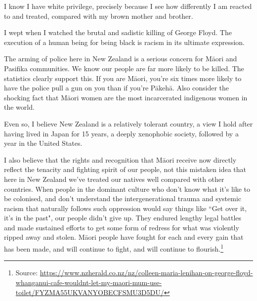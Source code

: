 \documentclass[10pt,a4paper]{article}
\newcommand{\qm}[1]{``#1"}
\newcommand{\source}[1]{\footnote{Source: \href{#1}{#1}}}
\begin{document}
I know I have white privilege, precisely because I see how differently I am reacted to and treated, compared with my brown mother and brother.

I wept when I watched the brutal and sadistic killing of George Floyd. The execution of a human being for being black is racism in its ultimate expression.

The arming of police here in New Zealand is a serious concern for Māori and Pasifika communities. We know our people are far more likely to be killed. The statistics clearly support this. If you are Māori, you're six times more likely to have the police pull a gun on you than if you're Pākehā. Also consider the shocking fact that Māori women are the most incarcerated indigenous women in the world.

Even so, I believe New Zealand is a relatively tolerant country, a view I hold after having lived in Japan for 15 years, a deeply xenophobic society, followed by a year in the United States.

I also believe that the rights and recognition that Māori receive now directly reflect the tenacity and fighting spirit of our people, not this mistaken idea that here in New Zealand we've treated our natives well compared with other countries. When people in the dominant culture who don't know what it's like to be colonised, and don't understand the intergenerational trauma and systemic racism that naturally follows such oppression would say things like \qm{Get over it, it's in the past}, our people didn't give up. They endured lengthy legal battles and made sustained efforts to get some form of redress for what was violently ripped away and stolen. Māori people have fought for each and every gain that has been made, and will continue to fight, and will continue to flourish.\source{https://www.nzherald.co.nz/nz/colleen-maria-lenihan-on-george-floyd-whanganui-cafe-wouldnt-let-my-maori-mum-use-toilet/FYZMA55UKVANYOBECFSMU3D5DU/}
\end{document}
